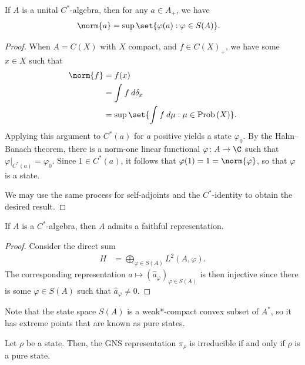 \documentclass[10pt]{mypackage}
\begin{document}
\begin{proposition}
  If $A$ is a unital $C^{\ast}$-algebra, then for any $a\in A_{+}$, we have
  \begin{align*}
    \norm{a} &= \sup\set{\varphi(a) : \varphi\in S(A)}.
  \end{align*}
\end{proposition}
\begin{proof}
  When $A = C(X)$ with $X$ compact, and $f\in C(X)_{+}$, we have some $x\in X$ such that
  \begin{align*}
    \norm{f} &= f(x)\\
             &= \int_{}^{} f\:d\delta_x\\
             &= \sup\set{ \int_{}^{} f\:d\mu : \mu\in \operatorname{Prob}\left( X \right) }.
  \end{align*}
  Applying this argument to $C^{\ast}\left( a \right)$ for $a$ positive yields a state $\varphi_0$. By the Hahn--Banach theorem, there is a norm-one linear functional $\varphi\colon A\to \C$ such that $\varphi|_{C^{\ast}\left( a \right)} = \varphi_0$. Since $1\in C^{\ast}\left( a \right)$, it follows that $\varphi(1) = 1 = \norm{\varphi}$, so that $\varphi$ is a state.

  We may use the same process for self-adjoints and the $C^{\ast}$-identity to obtain the desired result.
\end{proof}
\begin{corollary}
  If $A$ is a $C^{\ast}$-algebra, then $A$ admits a faithful representation.
\end{corollary}
\begin{proof}
  Consider the direct sum
  \begin{align*}
    H &= \bigoplus_{\varphi\in S(A)} L^2\left( A,\varphi \right).
  \end{align*}
  The corresponding representation $a\mapsto \left( \hat{a}_{\varphi} \right)_{\varphi\in S(A)}$ is then injective since there is some $\varphi\in S(A)$ such that $\hat{a}_{\varphi}\neq 0$.
\end{proof}
Note that the state space $S(A)$ is a weak*-compact convex subset of $A^{\ast}$, so it has extreme points that are known as pure states.
\begin{theorem}
  Let $\rho$ be a state. Then, the GNS representation $\pi_{\rho}$ is irreducible if and only if $\rho$ is a pure state.
\end{theorem}
\end{document}

